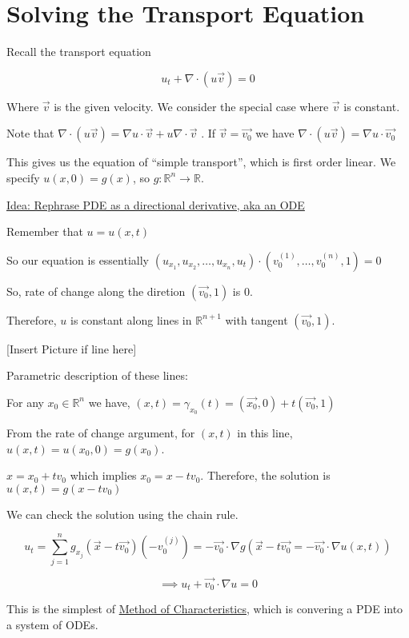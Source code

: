 \documentclass{article}
\theoremstyle{definition}
\begin{document}
\section*{Solving the Transport Equation}

Recall the transport equation

\[
    u_{t} + \nabla \cdot (u \vec{v} ) = 0
\]

Where \(\vec{v} \) is the given velocity. We consider the special case where \(\vec{v} \) is constant.

Note that \(\nabla \cdot (u \vec{v} )= \nabla u \cdot \vec{v} + u\nabla \cdot \vec{v} \) . If \(\vec{v} = \vec{v_0}\) we have \(\nabla \cdot (u \vec{v} ) = \nabla u \cdot \vec{v_0} \) 

This gives us the equation of ``simple transport'', which is first order linear. We specify \(u(x,0)=g(x)\), so \(g:\mathbb{R} ^n \to \mathbb{R} \).

\underline{Idea: Rephrase PDE as a directional derivative, aka an ODE}

Remember that \(u=u(x,t)\)

So our equation is essentially \( (u_{x_1}, u_{x_2},\dots , u_{x_n}, u_t)\cdot (v_0^{(1)},\dots ,v_0^{(n)}, 1) = 0 \) 

So, rate of change along the diretion \((\vec{v_0} , 1)\) is \(0\).

Therefore, \(u\) is constant along lines in \(\mathbb{R} ^{n+1}\) with tangent \((\vec{v_0} ,1)\).

[Insert Picture if line here]

Parametric description of these lines:

For any \(x_0\in\mathbb{R} ^n\) we have, \((x,t)=\gamma_{x_0}(t)=(\vec{x_0} ,0) + t(\vec{v_0} ,1)\)  

From the rate of change argument, for \((x,t)\) in this line, \(u(x,t)=u(x_0,0)=g(x_0)\).

\(x=x_0 + tv_0\) which implies \(x_0=x-tv_0\). Therefore, the solution is \(u(x,t)=g(x-tv_0)\) 

We can check the solution using the chain rule.

\[
    \displaystyle  u_t = \sum_{j=1}^{n} g_{x_j}(\vec{x} -t \vec{v_0} )(-v_0^{(j)}) = - \vec{v_0} \cdot \nabla g(\vec{x} -t \vec{v_0} = - \vec{v_0} \cdot \nabla u(x,t))
\] 

\[
    \implies u_{t} + \vec{v_0} \cdot \nabla u = 0 
\]

This is the simplest of \underline{Method of Characteristics}, which is convering a PDE into a system of ODEs.
\end{document}
